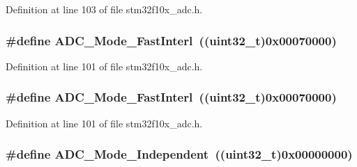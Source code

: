Definition at line 103 of file stm32f10x\+\_\+adc.\+h.

\subsubsection[{\texorpdfstring{A\+D\+C\+\_\+\+Mode\+\_\+\+Fast\+Interl}{ADC_Mode_FastInterl}}]{\setlength{\rightskip}{0pt plus 5cm}\#define A\+D\+C\+\_\+\+Mode\+\_\+\+Fast\+Interl~(({\bf uint32\+\_\+t})0x00070000)}\hypertarget{group___a_d_c__mode_ga843ecdd53625e2088e91819e43106a7a}{}\label{group___a_d_c__mode_ga843ecdd53625e2088e91819e43106a7a}


Definition at line 101 of file stm32f10x\+\_\+adc.\+h.

\subsubsection[{\texorpdfstring{A\+D\+C\+\_\+\+Mode\+\_\+\+Fast\+Interl}{ADC_Mode_FastInterl}}]{\setlength{\rightskip}{0pt plus 5cm}\#define A\+D\+C\+\_\+\+Mode\+\_\+\+Fast\+Interl~(({\bf uint32\+\_\+t})0x00070000)}\hypertarget{group___a_d_c__mode_ga843ecdd53625e2088e91819e43106a7a}{}\label{group___a_d_c__mode_ga843ecdd53625e2088e91819e43106a7a}


Definition at line 101 of file stm32f10x\+\_\+adc.\+h.

\subsubsection[{\texorpdfstring{A\+D\+C\+\_\+\+Mode\+\_\+\+Independent}{ADC_Mode_Independent}}]{\setlength{\rightskip}{0pt plus 5cm}\#define A\+D\+C\+\_\+\+Mode\+\_\+\+Independent~(({\bf uint32\+\_\+t})0x00000000)}\hypertarget{group___a_d_c__mode_ga2754d3a35559dc10e3d6a7d920e83432}{}\label{group___a_d_c__mode_ga2754d3a35559dc10e3d6a7d920e83432}


